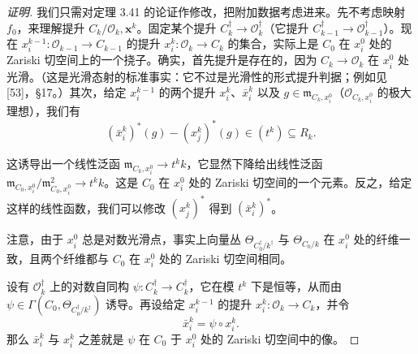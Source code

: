 
\begin{proof}[证明]
我们只需对定理 3.41 的论证作修改，把附加数据考虑进来。先不考虑映射 $f_0$，来理解提升 $C_k/\mathcal{O}_k,\mathbf{x}^k$。固定某个提升 $C_k^{\dagger}\to\mathcal{O}_k^{\dagger}$（它提升 $C_{k-1}^{\dagger}\to\mathcal{O}_{k-1}^{\dagger}$）。现在 $x_i^{k-1}:\mathcal{O}_{k-1}\to C_{k-1}$ 的提升 $x_i^k:\mathcal{O}_k\to C_k$ 的集合，实际上是 $C_0$ 在 $x_i^0$ 处的 Zariski 切空间上的一个挠子。确实，首先提升是存在的，因为 $C_k\to\mathcal{O}_k$ 在 $x_i^0$ 处光滑。（这是光滑态射的标准事实：它不过是光滑性的形式提升判据；例如见 [53]，§17。）其次，给定 $x_i^{k-1}$ 的两个提升 $x_i^k$、$\bar x_i^k$ 以及 $g\in\mathfrak{m}_{C_k,x_i^0}$（$\mathcal{O}_{C_k,x_i^0}$ 的极大理想），我们有
\[
  (\bar x_i^{k})^{*}(g)-(x_j^{k})^{*}(g)\in(t^k)\subseteq R_k.
\]

这诱导出一个线性泛函 $\mathfrak{m}_{C_k,x_i^0}\to t^kk$，它显然下降给出线性泛函 $\mathfrak{m}_{C_0,x_i^0}/\mathfrak{m}_{C_0,x_i^0}^2\to t^kk$。这是 $C_0$ 在 $x_i^0$ 处的 Zariski 切空间的一个元素。反之，给定这样的线性函数，我们可以修改 $(x_j^{k})^{*}$ 得到 $(\bar x_i^{k})^{*}$。

注意，由于 $x_i^0$ 总是对数光滑点，事实上向量丛 $\Theta_{C_0^{\dagger}/k^{\dagger}}$ 与 $\Theta_{C_0/k}$ 在 $x_i^0$ 处的纤维一致，且两个纤维都与 $C_0$ 在 $x_i^0$ 处的 Zariski 切空间相同。

设有 $\mathcal{O}_k^{\dagger}$ 上的对数自同构 $\psi:C_k^{\dagger}\to C_k^{\dagger}$，它在模 $t^k$ 下是恒等，从而由 $\psi\in\Gamma(C_0,\Theta_{C_0^{\dagger}/k^{\dagger}})$ 诱导。再设给定 $x_i^{k-1}$ 的提升 $x_i^k:\mathcal{O}_k\to C_k$，并令
\[
  \bar x_i^k=\psi\circ x_i^k.
\]
那么 $\bar x_i^k$ 与 $x_i^k$ 之差就是 $\psi$ 在 $C_0$ 于 $x_i^0$ 处的 Zariski 切空间中的像。


\end{proof}
